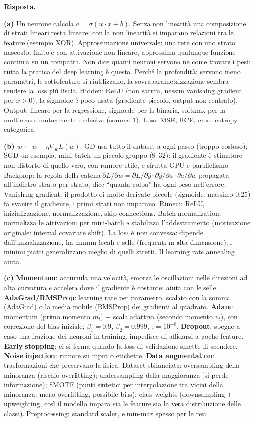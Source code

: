 \documentclass[11pt,a4paper]{article}
\newcommand{\Ris}[1]{\noindent\textbf{Risposta.}\par\nopagebreak #1}
\begin{document}
\Ris{
\textbf{(a)} Un neurone calcola $a=\sigma(w\cdot x+b)$. Senza non linearit\`a una composizione di strati lineari resta lineare; con la non linearit\`a si imparano relazioni tra le feature (esempio XOR).
Approssimazione universale: una rete con uno strato nascosto, finito e con attivazione non lineare, approssima qualunque funzione continua su un compatto. Non dice quanti neuroni servono n\'e come trovare i pesi: tutta la pratica del deep learning \`e questo.
Perch\'e la profondit\`a: servono meno parametri, le sottofeature si riutilizzano, la sovraparametrizzazione sembra rendere la loss pi\`u liscia.
Hidden: ReLU (non satura, nessun vanishing gradient per $x>0$); la sigmoide \`e poco usata (gradiente piccolo, output non centrato).
Output: lineare per la regressione, sigmoide per la binaria, softmax per la multiclasse mutuamente esclusiva (somma $1$). Loss: MSE, BCE, cross-entropy categorica.

\textbf{(b)} $w\leftarrow w-\eta\nabla_wL(w)$.
GD usa tutto il dataset a ogni passo (troppo costoso); SGD un esempio, mini-batch un piccolo gruppo ($8$--$32$): il gradiente \`e stimatore non distorto di quello vero, con rumore utile, e sfrutta GPU e parallelismo.
Backprop: la regola della catena $\partial L/\partial w=\partial L/\partial\hat y\cdot\partial\hat y/\partial a\cdot\partial a/\partial w$ propagata all'indietro strato per strato; dice ``quanta colpa'' ha ogni peso nell'errore.
Vanishing gradient: il prodotto di molte derivate piccole (sigmoide: massimo $0.25$) fa svanire il gradiente, i primi strati non imparano. Rimedi: ReLU, inizializzazione, normalizzazione, skip connections.
Batch normalization: normalizza le attivazioni per mini-batch e stabilizza l'addestramento (motivazione originale: internal covariate shift).
La loss \`e non convessa: dipende dall'inizializzazione, ha minimi locali e selle (frequenti in alta dimensione); i minimi piatti generalizzano meglio di quelli stretti. Il learning rate annealing aiuta.

\textbf{(c)} \textbf{Momentum}: accumula una velocit\`a, smorza le oscillazioni nelle direzioni ad alta curvatura e accelera dove il gradiente \`e costante; aiuta con le selle.
\textbf{AdaGrad/RMSProp}: learning rate per parametro, scalato con la somma (AdaGrad) o la media mobile (RMSProp) dei gradienti al quadrato.
\textbf{Adam}: momentum (primo momento $m_t$) $+$ scala adattiva (secondo momento $v_t$), con correzione del bias iniziale; $\beta_1=0.9$, $\beta_2=0.999$, $\epsilon=10^{-8}$.
\textbf{Dropout}: spegne a caso una frazione dei neuroni in training, impedisce di affidarsi a poche feature.
\textbf{Early stopping}: ci si ferma quando la loss di validazione smette di scendere. \textbf{Noise injection}: rumore su input o etichette. \textbf{Data augmentation}: trasformazioni che preservano la fisica.
Dataset sbilanciato: oversampling della minoranza (rischio overfitting); undersampling della maggioranza (si perde informazione); SMOTE (punti sintetici per interpolazione tra vicini della minoranza: meno overfitting, possibile bias); class weights (downsampling $+$ upweighting, cos\`i il modello impara sia le feature sia la vera distribuzione delle classi).
Preprocessing: standard scaler, e min-max spesso per le reti.
}
\end{document}
